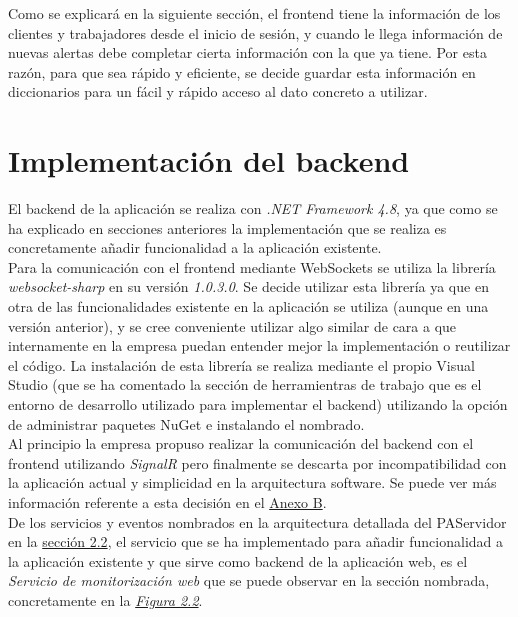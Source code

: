 Como se explicará en la siguiente sección, el frontend tiene la información de los clientes y trabajadores desde el inicio de sesión, y cuando le llega información de nuevas alertas debe completar cierta información con la que ya tiene. Por esta razón, para que sea rápido y eficiente, se decide guardar esta información en diccionarios para un fácil y rápido acceso al dato concreto a utilizar. 


\section{Implementación del backend}

El backend de la aplicación se realiza con \textit{.NET Framework 4.8}, ya que como se ha explicado en secciones anteriores la implementación que se realiza es concretamente añadir funcionalidad a la aplicación existente. \\

Para la comunicación con el frontend mediante WebSockets se utiliza la librería \textit{websocket-sharp} \cite{websocket-sharp} en su versión \textit{1.0.3.0}.
Se decide utilizar esta librería ya que en otra de las funcionalidades existente en la aplicación se utiliza (aunque en una versión anterior), y se cree conveniente utilizar algo similar de cara a que internamente en la empresa puedan entender mejor la implementación o reutilizar el código.
La instalación de esta librería se realiza mediante el propio Visual Studio (que se ha comentado la sección de herramientras de trabajo que es el entorno de desarrollo utilizado para implementar el backend) utilizando la opción de administrar paquetes NuGet e instalando el nombrado. \\

Al principio la empresa propuso realizar la comunicación del backend con el frontend utilizando \textit{SignalR} \cite{signalr} pero finalmente se descarta por incompatibilidad con la aplicación actual y simplicidad en la arquitectura software. Se puede ver más información referente a esta decisión en el \hyperref[anexo-b]{Anexo B}. \\


De los servicios y eventos nombrados en la arquitectura detallada del PAServidor en la \hyperref[section-arquitectura]{sección 2.2}, el servicio que se ha implementado para añadir funcionalidad a la aplicación existente y que sirve como backend de la aplicación web, es el \textit{Servicio de monitorización web} que se puede observar en la sección nombrada, concretamente en la \hyperref[fig:PAServidor]{\textit{Figura 2.2}}.\\

